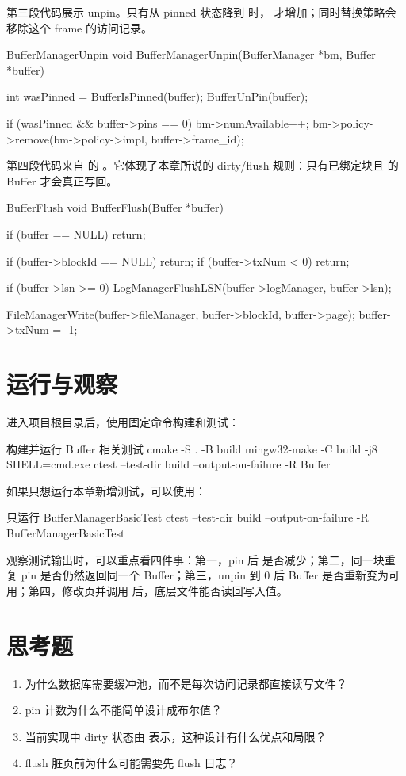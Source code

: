 第三段代码展示 unpin。只有从 pinned 状态降到  时， 才增加；同时替换策略会移除这个 frame 的访问记录。

\begin{dbcode}{BufferManagerUnpin}
void BufferManagerUnpin(BufferManager *bm, Buffer *buffer) {
    int wasPinned = BufferIsPinned(buffer);
    BufferUnPin(buffer);

    if (wasPinned && buffer->pins == 0) {
        bm->numAvailable++;
        bm->policy->remove(bm->policy->impl, buffer->frame_id);
    }
}
\end{dbcode}

第四段代码来自  的 。它体现了本章所说的 dirty/flush 规则：只有已绑定块且  的 Buffer 才会真正写回。

\begin{dbcode}{BufferFlush}
void BufferFlush(Buffer *buffer) {
    if (buffer == NULL)
        return;

    if (buffer->blockId == NULL)
        return;
    if (buffer->txNum < 0)
        return;

    if (buffer->lsn >= 0) {
        LogManagerFlushLSN(buffer->logManager, buffer->lsn);
    }

    FileManagerWrite(buffer->fileManager, buffer->blockId, buffer->page);
    buffer->txNum = -1;
}
\end{dbcode}

\section{运行与观察}
\label{sec:buffer-run}

进入项目根目录后，使用固定命令构建和测试：

\begin{dbcode}[listing options={language=bash}]{构建并运行 Buffer 相关测试}
cmake -S . -B build
mingw32-make -C build -j8 SHELL=cmd.exe
ctest --test-dir build --output-on-failure -R Buffer
\end{dbcode}

如果只想运行本章新增测试，可以使用：

\begin{dbcode}[listing options={language=bash}]{只运行 BufferManagerBasicTest}
ctest --test-dir build --output-on-failure -R BufferManagerBasicTest
\end{dbcode}

观察测试输出时，可以重点看四件事：第一，pin 后  是否减少；第二，同一块重复 pin 是否仍然返回同一个 Buffer；第三，unpin 到 0 后 Buffer 是否重新变为可用；第四，修改页并调用  后，底层文件能否读回写入值。

\section{思考题}
\label{sec:buffer-questions}

\begin{enumerate}
  \item 为什么数据库需要缓冲池，而不是每次访问记录都直接读写文件？
  \item pin 计数为什么不能简单设计成布尔值？
  \item 当前实现中 dirty 状态由  表示，这种设计有什么优点和局限？
  \item flush 脏页前为什么可能需要先 flush 日志？
\end{enumerate}
